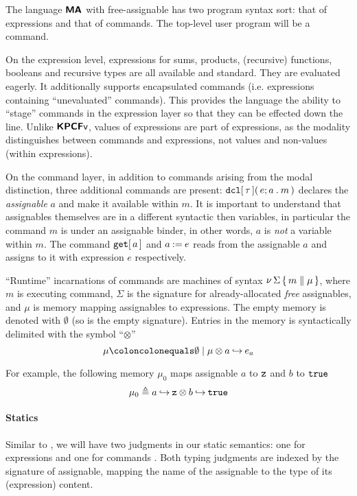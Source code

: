 \documentclass[11pt]{article}
\begin{document}
The language $\textbf{\textsf{MA}}$ with free-assignable has two program syntax sort: that of expressions and that of
commands. The top-level user program will be a command.

On the expression level, expressions for sums, products, (recursive) functions, booleans and recursive types
are all available and standard. They are evaluated eagerly. It additionally supports encapsulated commands
(i.e. expressions containing ``unevaluated'' commands). This provides the language the ability to ``stage''
commands in the expression layer so that they can be effected down the line. Unlike ${\textbf{\textsf{KPCF}}}\textsf{v}$, values of
expressions are part of expressions, as the modality distinguishes between commands and expressions, not
values and non-values (within expressions).

On the command layer, in addition to commands arising from the modal distinction, three additional
commands are present: ${\mathtt{dcl}}\mathtt{[}\,{\tau}\,\mathtt{]}\mathtt{(}\,e;{a}\mathbin{\mathtt{.}}{m}\,\mathtt{)}$ declares the \emph{assignable} $a$ and make it
available within $m$.
It is important to understand that assignables
themselves are in a different syntactic then variables, in particular the command $m$ is under an
assignable binder, in other words, $a$ is \emph{not} a variable within $m$.
The command ${\mathtt{get}}\mathtt{[}\,{a}\,\mathtt{]}$ and ${a}\mathbin{\mathtt{:=}}{e}$ reads from the assignable $a$
and assigns to it with expression $e$ respectively.

``Runtime'' incarnations of commands are machines of syntax $\mathop{\nu}{\Sigma}\,\{\,{m}\mathrel{\parallel}{\mu}\,\}$, where $m$ is
executing command, $\Sigma$ is the signature for already-allocated \emph{free} assignables,
and $\mu$ is memory mapping assignables to expressions. The empty memory is denoted with
$\emptyset$ (so is the empty signature).  Entries in the memory is syntactically delimited with the
symbol ``$\otimes$''
$$
 \mu \bnfdef \emptyset \mid \extff{\mu}{a}{e_a}
$$

For example, the following memory $\mu_0$ maps assignable $a$ to $\mathtt{z}$ and $b$ to $\mathtt{true}$
$$
\mu_0 \triangleq {a}\mathbin{\hookrightarrow}{\mathtt{z}}\mathbin{\otimes}{{b}\mathbin{\hookrightarrow}{\mathtt{true}}}
$$

\paragraph{Statics}

Similar to \LangKPCFv{}, we will have two judgments in our static semantics: one for expressions
and one for commands
.
Both typing judgments are indexed by the signature of assignable, mapping the name of the assignable to
the type of its (expression) content.
\end{document}
